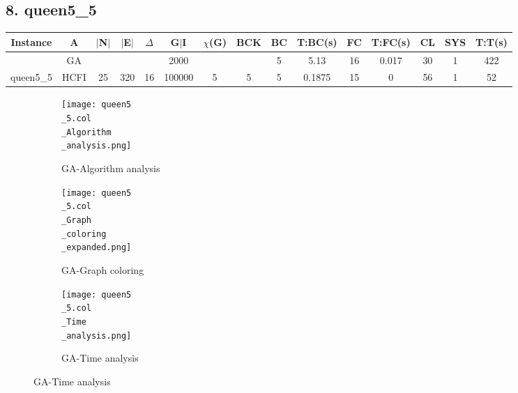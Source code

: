 \documentclass[10pt]{article}
\begin{document}
\subsection*{\hspace{0,9073976cm} 8. queen5\_5}
\begin{table}[H]
\centering
\begin{tabular}{|c|c|c|c|c|c|c|c|c|c|c|c|c|c|c|}
\hline
Instance& A &$|$N$|$ & $|$E$|$ & $\Delta$ & G$|$I & $\chi$(G) &BCK&BC & T:BC(s) & FC & T:FC(s) & CL & SYS & T:T(s) \\ \hline \hline
&GA&       &                   &                     &2000         &     \cellcolor{yellow} & {\cellcolor{yellow}}& {{\cellcolor{green}5}}
&5.13   &16         &0.017                   & 30                   & 1         &422        \\ \cline{2-2} \cline{6-6} \cline{9-15}
 \multirow{-2}{*}{queen5\_5} &HCFI   &\multirow{-2}{*}{25}   &\multirow{-2}{*}{320}     &\multirow{-2}{*}{16}     &100000     &\multirow{-2}{*}{\cellcolor{yellow}5}      & \multirow{-2}{*}{\cellcolor{yellow}5}    &{\cellcolor{green}5}     &0.1875          &15    &0         &56    &1     &52        \\ \hline 
\end{tabular}
\end{table}

\graphicspath{{./Core1/Solutions/GA/queen5\_5.col}}
\begin{figure}[H]
\begin{subfigure}{.33\textwidth}
  \centering
  \texttt{[image: queen5\\\_5.col\\\_Algorithm\\\_analysis.png]}
  \caption{GA-Algorithm analysis}
   \label{fig:subfig1}
\end{subfigure}%
\begin{subfigure}{.33\textwidth}
  \centering
  \texttt{[image: queen5\\\_5.col\\\_Graph\\\_coloring\\\_expanded.png]}
  \caption{GA-Graph coloring}
  \label{fig:subfig2}
\end{subfigure}
\begin{subfigure}{.33\textwidth}
  \centering
  \texttt{[image: queen5\\\_5.col\\\_Time\\\_analysis.png]}
  \caption{GA-Time analysis}
  \end{subfigure}
\end{figure}
\end{document}
